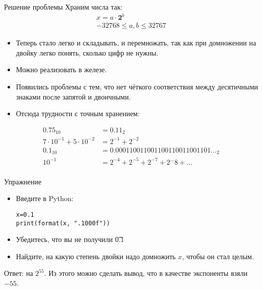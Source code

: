 \begin{frame}{Решение проблемы}
	Храним числа так:
	\begin{gather*}
		x = a \cdot \textbf{2}^b \\
		-32768 \le a, b \le 32767
	\end{gather*}
	\begin{itemize}
		\item Теперь стало легко и складывать, и перемножать, так как при домножении на двойку легко понять, сколько цифр не нужны.
		\item Можно реализовать в железе.
		\item Появились проблемы с тем, что нет чёткого соответствия между десятичными знаками после запятой и двоичными.
		\item Отсюда трудности с точным хранением:
	\end{itemize}
	\begin{align*}
		0.75_{10} &= {0.11}_{2} \\
		7 \cdot 10^{-1} + 5 \cdot 10^{-2} &= 2^{-1} + 2^{-2} \\
		0.1_{10} &= {0.000110011001100110011001101\dots}_{2} \\
		10^{-1} &= 2^{-4} + 2^{-5} + 2^{-7} + 2{^-8} + \dots \\
	\end{align*}
\end{frame}

\begin{frame}[fragile]{Упражнение}
	\begin{itemize}
		\item
			Введите в Python:
\begin{verbatim}
x=0.1
print(format(x, ".1000f"))
\end{verbatim}
		\item
			Убедитесь, что вы не получили \t{0.1}
		\item
			Найдите, на какую степень двойки надо домножить $x$, чтобы он стал целым.
	\end{itemize}
	\pause
	Ответ: на $2^{55}$.
	Из этого можно сделать вывод, что в качестве экспоненты взяли $-55$.
\end{frame}

